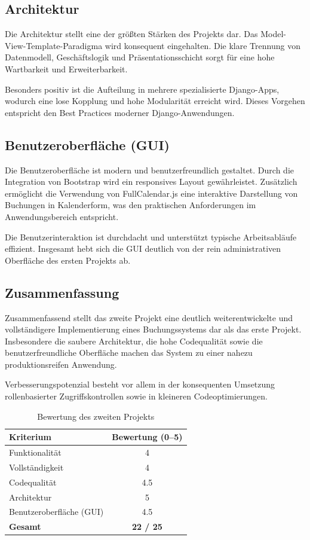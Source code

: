 \subsection{Architektur}

Die Architektur stellt eine der größten Stärken des Projekts dar. Das Model-View-Template-Paradigma wird konsequent eingehalten. Die klare Trennung von Datenmodell, Geschäftslogik und Präsentationsschicht sorgt für eine hohe Wartbarkeit und Erweiterbarkeit.

Besonders positiv ist die Aufteilung in mehrere spezialisierte Django-Apps, wodurch eine lose Kopplung und hohe Modularität erreicht wird. Dieses Vorgehen entspricht den Best Practices moderner Django-Anwendungen.

\subsection{Benutzeroberfläche (GUI)}

Die Benutzeroberfläche ist modern und benutzerfreundlich gestaltet. Durch die Integration von Bootstrap wird ein responsives Layout gewährleistet. Zusätzlich ermöglicht die Verwendung von FullCalendar.js eine interaktive Darstellung von Buchungen in Kalenderform, was den praktischen Anforderungen im Anwendungsbereich entspricht.

Die Benutzerinteraktion ist durchdacht und unterstützt typische Arbeitsabläufe effizient. Insgesamt hebt sich die GUI deutlich von der rein administrativen Oberfläche des ersten Projekts ab.

\subsection{Zusammenfassung}

Zusammenfassend stellt das zweite Projekt eine deutlich weiterentwickelte und vollständigere Implementierung eines Buchungssystems dar als das erste Projekt. Insbesondere die saubere Architektur, die hohe Codequalität sowie die benutzerfreundliche Oberfläche machen das System zu einer nahezu produktionsreifen Anwendung.

Verbesserungspotenzial besteht vor allem in der konsequenten Umsetzung rollenbasierter Zugriffskontrollen sowie in kleineren Codeoptimierungen.


\begin{table}[h]
\centering
\caption{Bewertung des zweiten Projekts}
\begin{tabular}{l c}
\hline
\textbf{Kriterium} & \textbf{Bewertung (0--5)} \\
\hline
Funktionalität & 4 \\
Vollständigkeit & 4 \\
Codequalität & 4.5 \\
Architektur & 5 \\
Benutzeroberfläche (GUI) & 4.5 \\
\hline
\textbf{Gesamt} & \textbf{22 / 25} \\
\hline
\end{tabular}
\end{table}

